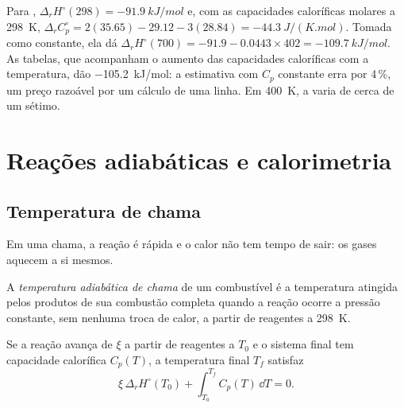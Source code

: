 \begin{example}\label{ex:b2:reaction-enthalpy:kirchhoff}
Para , $\Delta_r H^\circ(298) =
\qty{-91.9}{kJ/mol}$ e, com as capacidades caloríficas molares a \qty{298}{K},
$\Delta_r C_p^\circ = 2(35.65) - 29.12 - 3(28.84) =
\qty{-44.3}{J/(K.mol)}$. Tomada como constante, ela dá $\Delta_r
H^\circ(700) = -91.9 - 0.0443 \times 402 = \qty{-109.7}{kJ/mol}$. As tabelas,
que acompanham o aumento das capacidades caloríficas com a temperatura, dão
\qty{-105.2}{kJ/mol}: a estimativa com $C_p$ constante erra por 4\,\%, um
preço razoável por um cálculo de uma linha. Em \qty{400}{K}, a  varia de cerca de um sétimo.
\end{example}

\section{Reações adiabáticas e calorimetria}

\subsection*{Temperatura de chama}

Em uma chama, a reação é rápida e o calor não tem tempo de sair: os
gases aquecem a si mesmos.

\begin{definition}\label{def:b2:reaction-enthalpy:flame-temperature}
A \emph{temperatura adiabática de chama}
de um combustível é a temperatura atingida pelos produtos de sua combustão
completa quando a reação ocorre a pressão constante, sem nenhuma troca de
calor, a partir de reagentes a \qty{298}{K}.
\end{definition}

\begin{proposition}\label{prop:b2:reaction-enthalpy:flame}
Se a reação avança de $\xi$ a partir de reagentes a $T_0$ e o sistema
final tem capacidade calorífica $C_p(T)$, a temperatura final $T_f$ satisfaz
\[
  \xi\,\Delta_r H^\circ(T_0) + \int_{T_0}^{T_f}C_p(T)\,\dd T = 0 .
\]
\end{proposition}

